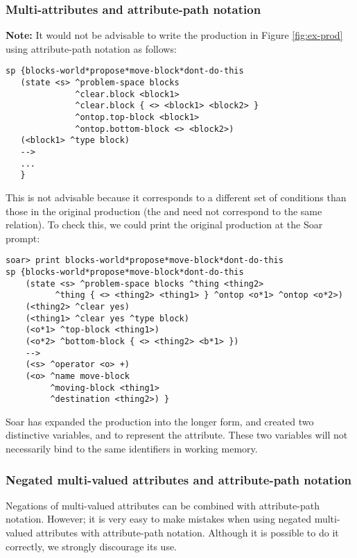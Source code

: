 \subsubsection*{Multi-attributes and attribute-path notation}
\label{SYNTAX-pm-caveat}

\textbf{Note:} It would not be advisable to write the production in Figure
\ref{fig:ex-prod} using attribute-path notation as follows:

\begin{verbatim}
sp {blocks-world*propose*move-block*dont-do-this
   (state <s> ^problem-space blocks
              ^clear.block <block1>
              ^clear.block { <> <block1> <block2> }
              ^ontop.top-block <block1>
              ^ontop.bottom-block <> <block2>)
   (<block1> ^type block)
   -->
   ...
   }
\end{verbatim}

This is not advisable because it corresponds to a different set of conditions
than those in the original production (the  and
 need not correspond to the same  relation).
To check this, we could print the original production at the Soar prompt:

\begin{verbatim}
soar> print blocks-world*propose*move-block*dont-do-this
sp {blocks-world*propose*move-block*dont-do-this
    (state <s> ^problem-space blocks ^thing <thing2>
          ^thing { <> <thing2> <thing1> } ^ontop <o*1> ^ontop <o*2>)
    (<thing2> ^clear yes)
    (<thing1> ^clear yes ^type block)
    (<o*1> ^top-block <thing1>)
    (<o*2> ^bottom-block { <> <thing2> <b*1> })
    -->
    (<s> ^operator <o> +)
    (<o> ^name move-block 
         ^moving-block <thing1> 
         ^destination <thing2>) }
\end{verbatim}

Soar has expanded the production into the longer form, and created two
distinctive variables,  and  to represent the
 attribute. These two variables will not necessarily bind to the
same identifiers in working memory.

\subsubsection*{Negated multi-valued attributes and attribute-path notation}

Negations of multi-valued attributes can be combined with attribute-path
notation. However; it is very easy to make mistakes when using negated
multi-valued attributes with attribute-path notation. Although it is
possible to do it correctly, we strongly discourage its use.

